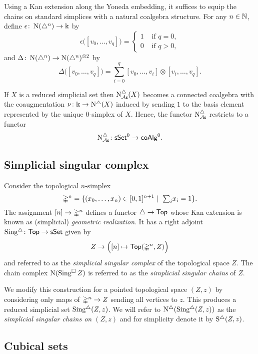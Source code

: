 Using a Kan extension along the Yoneda embedding, it suffices to equip the chains on standard simplices with a natural coalgebra structure.
For any $n \in \mathbb{N}$, define $\epsilon  \colon \operatorname{N}(\triangle^n) \to \Bbbk$ by
\[
\epsilon \big( [v_0, \dots, v_q] \big) = \begin{cases} 1 & \text{ if } q = 0, \\ 0 & \text{ if } q>0, \end{cases}
\]
and $\Delta \colon \operatorname{N}(\triangle^n) \to \operatorname{N}(\triangle^n)^{\otimes2}$ by
\[
\Delta \big( [v_0, \dots, v_q] \big) = \sum_{i=0}^q [v_0, \dots, v_i] \otimes [v_i, \dots, v_q].
\]

If $X$ is a reduced simplicial set then $\operatorname{N^{\triangle}_{{\mathcal{A}\mathsf{s}}}}(X)$ becomes a connected coalgebra with the coaugmentation $\nu \colon \Bbbk \to \operatorname{N^{\triangle}}(X)$ induced by sending $1$ to the basis element represented by the unique $0$-simplex of $X$.
Hence, the functor $\operatorname{N^{\triangle}_{{\mathcal{A}\mathsf{s}}}}$ restricts to a functor
\[
\operatorname{N^{\triangle}_{{\mathcal{A}\mathsf{s}}}} \colon \mathsf{sSet}^0 \to \mathsf{coAlg}^0.
\]

\subsection{Simplicial singular complex}

Consider the topological $n$-simplex
\[
\mathbb{\Delta}^{n} = \{(x_0, \dots, x_n) \in [0,1]^{n+1} \mid \ \textstyle{\sum}_i x_i = 1\}.
\]
The assignment $[n] \to \mathbb{\Delta}^n$ defines a functor $\triangle \to \mathsf{Top}$ whose Kan extension is known as (simplicial) \textit{geometric realization}.
It has a right adjoint $\operatorname{Sing^{\triangle}} \colon \mathsf{Top} \to \mathsf{sSet}$ given by
\[
Z \to \Big( [n] \mapsto \mathsf{Top}(\mathbb{\Delta}^n, Z) \Big)
\]
and referred to as the \textit{simplicial singular complex} of the topological space $Z$.
The chain complex $\operatorname{N}(\operatorname{Sing^{\square}} Z)$ is referred to as the \textit{simplicial singular chains} of $Z$.

We modify this construction for a pointed topological space $(Z, z)$ by considering only maps of $\mathbb{\Delta}^n \to Z$ sending all vertices to $z$.
This produces a reduced simplicial set $\operatorname{Sing^{\triangle}}(Z, z)$.
We will refer to $\operatorname{N^{\triangle}}(\operatorname{Sing^{\triangle}}(Z, z))$ as the \textit{simplicial singular chains on $(Z, z)$} and for simplicity denote it by $\operatorname{S^{\triangle}}(Z, z)$.

\subsection{Cubical sets} \label{ss:cubical sets}

